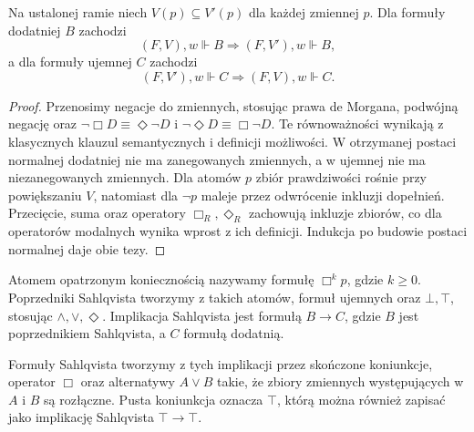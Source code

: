 \begin{lemat}
\label{lem:ncl-kripke-polarity-monotonicity}
Na ustalonej ramie niech $V(p)\subseteq V'(p)$
dla każdej zmiennej $p$. Dla formuły dodatniej
$B$ zachodzi
\[
 (F,V),w\Vdash B\Longrightarrow(F,V'),w\Vdash B,
\]
a dla formuły ujemnej $C$ zachodzi
\[
 (F,V'),w\Vdash C\Longrightarrow(F,V),w\Vdash C.
\]
\end{lemat}
\begin{proof}
Przenosimy negacje do zmiennych, stosując
prawa de Morgana, podwójną negację oraz
$\neg\Box D\equiv\Diamond\neg D$ i
$\neg\Diamond D\equiv\Box\neg D$.
Te równoważności wynikają z klasycznych
klauzul semantycznych i definicji możliwości.
W otrzymanej postaci normalnej dodatniej
nie ma zanegowanych zmiennych, a w ujemnej
nie ma niezanegowanych zmiennych.
Dla atomów $p$ zbiór prawdziwości rośnie
przy powiększaniu $V$, natomiast dla $\neg p$
maleje przez odwrócenie inkluzji dopełnień.
Przecięcie, suma oraz operatory
$\Box_R,\Diamond_R$ zachowują inkluzje
zbiorów, co dla operatorów modalnych wynika
wprost z ich definicji. Indukcja po budowie
postaci normalnej daje obie tezy.
\end{proof}

\begin{definicja}
\label{def:ncl-kripke-sahlqvist}
Atomem opatrzonym koniecznością nazywamy
formułę $\Box^k p$, gdzie $k\geq0$.
Poprzedniki Sahlqvista tworzymy z takich
atomów, formuł ujemnych oraz $\bot,\top$,
stosując $\wedge,\vee,\Diamond$.
Implikacja Sahlqvista jest formułą $B\to C$,
gdzie $B$ jest poprzednikiem Sahlqvista,
a $C$ formułą dodatnią.

Formuły Sahlqvista tworzymy z tych implikacji
przez skończone koniunkcje, operator $\Box$
oraz alternatywy $A\vee B$ takie, że
zbiory zmiennych występujących w $A$ i $B$
są rozłączne. Pusta koniunkcja oznacza $\top$,
którą można również zapisać jako
implikację Sahlqvista $\top\to\top$.
\end{definicja}

